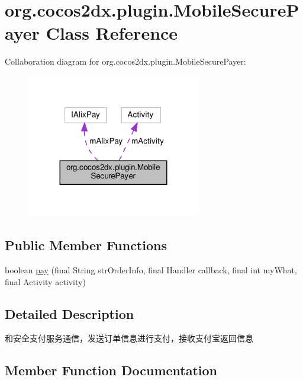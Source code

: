 \hypertarget{classorg_1_1cocos2dx_1_1plugin_1_1MobileSecurePayer}{}\section{org.\+cocos2dx.\+plugin.\+Mobile\+Secure\+Payer Class Reference}
\label{classorg_1_1cocos2dx_1_1plugin_1_1MobileSecurePayer}


Collaboration diagram for org.\+cocos2dx.\+plugin.\+Mobile\+Secure\+Payer\+:
\nopagebreak
\begin{figure}[H]
\begin{center}
\leavevmode
\includegraphics[width=215pt]{classorg_1_1cocos2dx_1_1plugin_1_1MobileSecurePayer__coll__graph}
\end{center}
\end{figure}
\subsection*{Public Member Functions}
\begin{DoxyCompactItemize}
\item 
boolean \hyperlink{classorg_1_1cocos2dx_1_1plugin_1_1MobileSecurePayer_aafc7e1168a5023be05955256e8e45d5c}{pay} (final String str\+Order\+Info, final Handler callback, final int my\+What, final Activity activity)
\end{DoxyCompactItemize}


\subsection{Detailed Description}
和安全支付服务通信，发送订单信息进行支付，接收支付宝返回信息 

\subsection{Member Function Documentation}
\mbox{\label{classorg_1_1cocos2dx_1_1plugin_1_1MobileSecurePayer_aafc7e1168a5023be05955256e8e45d5c}} 
